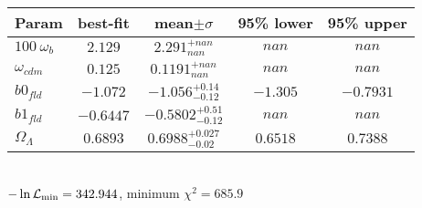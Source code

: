 \begin{tabular}{|l|c|c|c|c|} 
 \hline 
Param & best-fit & mean$\pm\sigma$ & 95\% lower & 95\% upper \\ \hline 
$100~\omega_{b }$ &$2.129$ & $2.291_{nan}^{+nan}$ & $nan$ & $nan$ \\ 
$\omega_{cdm }$ &$0.125$ & $0.1191_{nan}^{+nan}$ & $nan$ & $nan$ \\ 
$b0_{fld }$ &$-1.072$ & $-1.056_{-0.12}^{+0.14}$ & $-1.305$ & $-0.7931$ \\ 
$b1_{fld }$ &$-0.6447$ & $-0.5802_{-0.12}^{+0.51}$ & $nan$ & $nan$ \\ 
$\Omega_{\Lambda }$ &$0.6893$ & $0.6988_{-0.02}^{+0.027}$ & $0.6518$ & $0.7388$ \\ 
\hline 
 \end{tabular} \\ 
$-\ln{\cal L}_\mathrm{min} =342.944$, minimum $\chi^2=685.9$ \\ 
